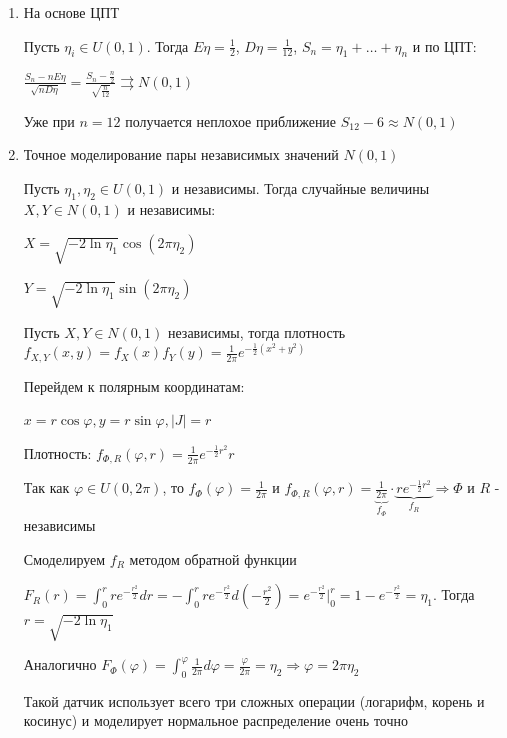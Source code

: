 \documentclass[12pt]{article}
\begin{document}
\begin{enumerate}[label*=\Roman*. ]
    \item На основе ЦПТ

    Пусть $\eta_i \in U(0, 1)$. Тогда $E\eta = \frac{1}{2}$, $D\eta = \frac{1}{12}$, $S_n = \eta_1 + \dots + \eta_n$ и по ЦПТ:

    $\frac{S_n - nE\eta}{\sqrt{n D\eta}} = \frac{S_n - \frac{n}{2}}{\sqrt{\frac{n}{12}}} \rightrightarrows N(0, 1)$

    Уже при $n = 12$ получается неплохое приближение $S_{12} - 6 \approx N(0, 1)$ 

    \item Точное моделирование пары независимых значений $N(0, 1)$

    \begin{MyTheorem}
        Пусть $\eta_1, \eta_2 \in U(0, 1)$ и независимы. Тогда случайные величины $X, Y \in N(0, 1)$ и независимы:

        $X = \sqrt{-2\ln \eta_1} \cos (2 \pi \eta_2)$

        $Y = \sqrt{-2\ln \eta_1} \sin (2 \pi \eta_2)$
    \end{MyTheorem}
    
    \begin{MyProof}
        Пусть $X, Y \in N(0, 1)$ независимы, тогда плотность $f_{X, Y}(x, y) = f_X(x)f_Y(y) = \frac{1}{2\pi} e^{-\frac{1}{2} (x^2 + y^2)}$

        Перейдем к полярным координатам:

        $x = r \cos \varphi, y = r \sin \varphi, |J| = r$

        Плотность: $f_{\Phi, R}(\varphi, r) = \frac{1}{2\pi} e^{-\frac{1}{2}r^2} r$

        Так как $\varphi \in U(0, 2\pi)$, то $f_{\Phi}(\varphi) = \frac{1}{2\pi}$ и $f_{\Phi, R}(\varphi, r) = \underset{f_\Phi}{\underbrace{\frac{1}{2\pi}}} \cdot \underset{f_R}{\underbrace{r e^{-\frac{1}{2}r^2}}} \Longrightarrow \Phi$ и $R$ - независимы 

        Смоделируем $f_R$ методом обратной функции

        $F_R(r) = \int_0^r r e^{-\frac{r^2}{2}} dr = -\int_0^r r e^{-\frac{r^2}{2}} d\left(-\frac{r^2}{2}\right) = e^{-\frac{r^2}{2}} \Big|_0^r = 1 - e^{-\frac{r^2}{2}} = \eta_1$. Тогда $r = \sqrt{-2\ln \eta_1}$

        Аналогично $F_\Phi(\varphi) = \int_0^\varphi \frac{1}{2\pi} d\varphi = \frac{\varphi}{2\pi} = \eta_2 \Longrightarrow \varphi = 2\pi \eta_2$
    \end{MyProof}

    Такой датчик использует всего три сложных операции (логарифм, корень и косинус) и моделирует нормальное распределение очень точно
\end{enumerate}
\end{document}
